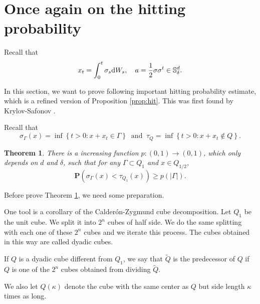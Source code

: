 \documentclass[twoside, 12pt]{book}
\numberwithin{equation}{chapter}
\newtheorem{theorem}{Theorem}[section]
\def\mS{{\mathbb S}}
\def\bP{{\mathbf P}}
\def\l{\left}
\def\r{\right}
\def\geq{\geqslant}
\def\d{\text{\rm{d}}}
\begin{document}
	
	\section{Once again on the hitting probability}
	Recall that 
	\[
	x_t=\int_0^t \sigma_s \d W_s, \quad a=\frac{1}{2}\sigma \sigma^t \in \mS^d_\delta. 
	\]
	
	In this section, we want to prove following important hitting probability estimate, which is a refined version of Proposition \ref{prop:hit}. This was first found by Krylov-Safonov \cite{krylov1979estimate}. 
	
	Recall that 
	\[
	    \sigma_{\Gamma}(x)= \inf\l\{t>0: x+x_t\in \Gamma\r\} ~\mbox{ and }~ \tau_Q= \inf\l\{t>0: x+x_t\notin Q\r\}. 
	\]
	\begin{theorem}\label{thm:hit}
		There is a increasing function $p: (0,1)\to (0,1)$, which only depends on $d$ and $\delta$, such that for any $\Gamma \subset Q_1$ and $x\in Q_{1/2}$,  
		\begin{equation}
			\bP (\sigma_\Gamma(x)<\tau_{Q_1}(x)) \geq p(|\Gamma|). 
		\end{equation}
	\end{theorem}
	
	Before prove Theorem \ref{thm:hit}, we need some preparation.  
	
	One tool is a corollary of the Calderón-Zygmund cube decomposition. Let $Q_1$ be the unit cube. We split it into $2^n$ cubes of half side. We do the same splitting with each one of these $2^n$ cubes and we iterate this process. The cubes obtained in this way are called dyadic cubes. 
	
	If $Q$ is a dyadic cube different from $Q_1$, we say that $\widetilde{Q}$ is the predecessor of $Q$ if $Q$ is one of the $2^n$ cubes obtained from dividing $\widetilde{Q}$.
	
	We also let $Q(\kappa)$ denote the cube with the same center as $Q$ but side length $\kappa$ times as long.
	
\end{document}
